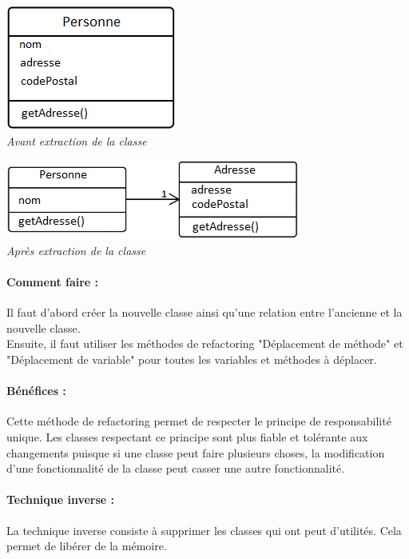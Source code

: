 \documentclass[a4paper,twoside,12pt,openright]{report}
\begin{document}
\begin{center}
\includegraphics[scale=1]{Image/Extraction_Classe.png}\\
\itshape{Avant extraction de la classe}
\end{center}

\begin{center}
\includegraphics[scale=1]{Image/Extraction_Classe2.png}\\
\itshape{Après extraction de la classe}
\end{center}

\paragraph{Comment faire :}
Il faut d'abord créer la nouvelle classe ainsi qu'une relation entre l'ancienne et la nouvelle classe.\\
Ensuite, il faut utiliser les méthodes de refactoring "Déplacement de méthode" et "Déplacement de variable" pour toutes les variables et méthodes à déplacer.

\paragraph{Bénéfices :}
Cette méthode de refactoring permet de respecter le principe de responsabilité unique.
Les classes respectant ce principe sont plus fiable et tolérante aux changements puisque si une classe peut faire plusieurs choses, la modification d'une fonctionnalité de la classe peut casser une autre fonctionnalité.

\paragraph{Technique inverse :}
La technique inverse consiste à supprimer les classes qui ont peut d'utilités. Cela permet de libérer de la mémoire.\\
\end{document}

